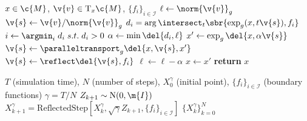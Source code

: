 \begin{algorithm}[t]
	\begin{algorithmic}
		\Require \(x \in \c{M}\), \(\v{v} \in \mathrm{T}_x\c{M}\), \(\{f_i\}_{i \in \mathcal{I}}\)
		\State \(\ell \gets \norm{\v{v}}_g\)
		\State \(\v{s} \gets \v{v} / \norm{\v{v}}_g\)
		\State \(d_i = \arg \intersect_t\sbr{\exp_g(x, t\v{s}), f_i}\)
		\State \(i \gets \argmin_i\; d_i \; s.t. \; d_i > 0\)
		\State \(\alpha \gets \min\del{d_i, \ell} \)
		\State \(x' \gets \exp_g\del{x, \alpha\v{s}}\)
		\State \(\v{s} \gets \paralleltransport_g\del{x, \v{s}, x'} \)
		\State \(\v{s} \gets \reflect\del{\v{s}, f_i}\)
		\State \(\ell \gets \ell - \alpha\)
		\State \(x \gets x'\)
		\EndWhile
		\State \textbf{return} \(x\)
	\end{algorithmic}
	\caption{\emph{Reflected step algorithm}.
		The algorithm operates by repeatedly taking geodesic steps until one of the constraints is violated, or the step is fully taken.
		Upon hitting the boundary we parallel transport the tangent vector to the boundary and then reflect it against the boundary.
		We then start a new geodesic from this point in the new direction.
		The \({\arg} \intersect_t\) function computes the distance one must travel along a geodesic in direction \(\v{s}\) til constraint \(f_i\) is intersected.
		For a discussion of \(\paralleltransport\), \(\exp_g\) and \(\reflect\) please see \cref{sec:riemannain_intro_dupref}.
	}
	\label{alg:reflection}
\end{algorithm}

\begin{algorithm}[t]
	\caption{\emph{Reflected Random Walk}.
		Discretisation of the stochastic differential equation \(\mathrm{d} \v{X}_t = b(t, \v{X}_t) \mathrm{d} t + \mathrm{d} \v{B}_t - \mathrm{d} \v{k}_t\).
	}
	\label{alg:rrw}
	\begin{algorithmic}
		 \(T\) (simulation time), \(N\) (number of steps), \(X_0^\gamma\) (initial point), \(\{f_i\}_{i \in \mathcal{I}}\) (boundary functions)
		\State \(\gamma = T / N\)
		\For{\(k \in \{0, \dots, N-1\}\)}
		\State \(Z_{k+1} \sim \mathrm{N}(0, \m{I})\)
		\State \(X_{k+1}^\gamma = \text{ReflectedStep}[X_{k}^\gamma, \sqrt{\gamma}
			Z_{k+1}, \{f_i\}_{i \in \mathcal{I}}]\) \EndFor {} \(\{ X_k^\gamma\}_{k=0}^{N}\) \end{algorithmic} \end{algorithm} 

